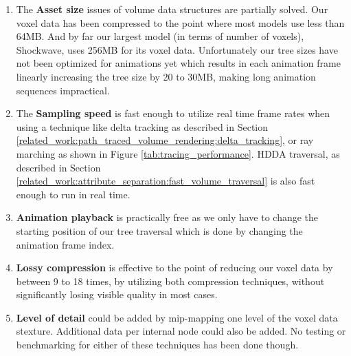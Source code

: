 \begin{enumerate}
    \item The \textbf{Asset size} issues of volume data structures are partially solved. Our voxel data has been compressed to the point where most models use less than 64MB. And by far our largest model (in terms of number of voxels), Shockwave, uses 256MB for its voxel data. Unfortunately our tree sizes have not been optimized for animations yet which results in each animation frame linearly increasing the tree size by 20 to 30MB, making long animation sequences impractical.
    \item The \textbf{Sampling speed} is fast enough to utilize real time frame rates when using a technique like delta tracking as described in Section \ref{related_work:path_traced_volume_rendering:delta_tracking}, or ray marching as shown in Figure \ref{tab:tracing_performance}. HDDA traversal, as described in Section \ref{related_work:attribute_separation:fast_volume_traversal} is also fast enough to run in real time.
    \item \textbf{Animation playback} is practically free as we only have to change the starting position of our tree traversal which is done by changing the animation frame index.
    \item \textbf{Lossy compression} is effective to the point of reducing our voxel data by between 9 to 18 times, by utilizing both compression techniques, without significantly losing visible quality in most cases.
    \item \textbf{Level of detail} could be added by mip-mapping one level of the voxel data stexture. Additional data per internal node could also be added. No testing or benchmarking for either of these techniques has been done though.
\end{enumerate}


